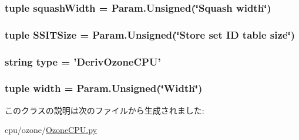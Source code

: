 \label{classOzoneCPU_1_1DerivOzoneCPU_a910857438278a89a287832cf7087317b}
\hypertarget{classOzoneCPU_1_1DerivOzoneCPU_a822a947e7bb7034547d91ec80d337303}{
\subsubsection[{squashWidth}]{\setlength{\rightskip}{0pt plus 5cm}tuple {\bf squashWidth} = Param.Unsigned(\char`\"{}Squash {\bf width}\char`\"{})}}
\label{classOzoneCPU_1_1DerivOzoneCPU_a822a947e7bb7034547d91ec80d337303}
\hypertarget{classOzoneCPU_1_1DerivOzoneCPU_aaae81435109fd5abd8db9e1cac852536}{
\subsubsection[{SSITSize}]{\setlength{\rightskip}{0pt plus 5cm}tuple {\bf SSITSize} = Param.Unsigned(\char`\"{}Store set ID table size\char`\"{})}}
\label{classOzoneCPU_1_1DerivOzoneCPU_aaae81435109fd5abd8db9e1cac852536}
\hypertarget{classOzoneCPU_1_1DerivOzoneCPU_acce15679d830831b0bbe8ebc2a60b2ca}{
\subsubsection[{type}]{\setlength{\rightskip}{0pt plus 5cm}string {\bf type} = '{\bf DerivOzoneCPU}'}}
\label{classOzoneCPU_1_1DerivOzoneCPU_acce15679d830831b0bbe8ebc2a60b2ca}
\hypertarget{classOzoneCPU_1_1DerivOzoneCPU_a397bb3beea7b21f074bc75e1e71f132f}{
\subsubsection[{width}]{\setlength{\rightskip}{0pt plus 5cm}tuple {\bf width} = Param.Unsigned(\char`\"{}Width\char`\"{})}}
\label{classOzoneCPU_1_1DerivOzoneCPU_a397bb3beea7b21f074bc75e1e71f132f}


このクラスの説明は次のファイルから生成されました:\begin{DoxyCompactItemize}
\item 
cpu/ozone/\hyperlink{OzoneCPU_8py}{OzoneCPU.py}\end{DoxyCompactItemize}
